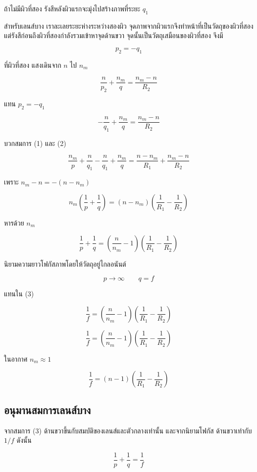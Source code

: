 ถ้าไม่มีผิวที่สอง รังสีหลังผิวแรกจะมุ่งไปสร้างภาพที่ระยะ $q_1$

สำหรับเลนส์บาง เราละเลยระยะห่างระหว่างสองผิว จุดภาพจากผิวแรกจึงทำหน้าที่เป็นวัตถุของผิวที่สอง แต่รังสีก่อนถึงผิวที่สองกำลังรวมเข้าหาจุดด้านขวา จุดนั้นเป็นวัตถุเสมือนของผิวที่สอง จึงมี

\[
p_2=-q_1
\]

ที่ผิวที่สอง แสงเดินจาก $n$ ไป $n_m$

\[
\frac{n}{p_2}
+
\frac{n_m}{q}
=
\frac{n_m-n}{R_2}
\]

แทน $p_2=-q_1$

\[
-\frac{n}{q_1}
+
\frac{n_m}{q}
=
\frac{n_m-n}{R_2}
\tag{2}
\]

บวกสมการ (1) และ (2)

\[
\frac{n_m}{p}
+
\frac{n}{q_1}
-
\frac{n}{q_1}
+
\frac{n_m}{q}
=
\frac{n-n_m}{R_1}
+
\frac{n_m-n}{R_2}
\]

เพราะ $n_m-n=-(n-n_m)$

\[
n_m\left(\frac{1}{p}+\frac{1}{q}\right)
=
(n-n_m)
\left(\frac{1}{R_1}-\frac{1}{R_2}\right)
\]

หารด้วย $n_m$

\[
\frac{1}{p}+\frac{1}{q}
=
\left(\frac{n}{n_m}-1\right)
\left(\frac{1}{R_1}-\frac{1}{R_2}\right)
\tag{3}
\]

นิยามความยาวโฟกัสภาพโดยให้วัตถุอยู่ไกลอนันต์

\[
p\to\infty
\qquad
q=f
\]

แทนใน (3)

\[
\frac{1}{f}
=
\left(\frac{n}{n_m}-1\right)
\left(\frac{1}{R_1}-\frac{1}{R_2}\right)
\]

\begin{tcolorbox}[title={สมการช่างทำเลนส์}]
\[
\boxed{
\frac{1}{f}
=
\left(\frac{n}{n_m}-1\right)
\left(\frac{1}{R_1}-\frac{1}{R_2}\right)}
\]

ในอากาศ $n_m\approx1$

\[
\boxed{
\frac{1}{f}
=
(n-1)
\left(\frac{1}{R_1}-\frac{1}{R_2}\right)}
\]
\end{tcolorbox}

\subsection{อนุมานสมการเลนส์บาง}

จากสมการ (3) ด้านขวาขึ้นกับสมบัติของเลนส์และตัวกลางเท่านั้น และจากนิยามโฟกัส ด้านขวาเท่ากับ $1/f$ ดังนั้น

\begin{tcolorbox}[title={สมการเลนส์บาง}]
\[
\boxed{\frac{1}{p}+\frac{1}{q}=\frac{1}{f}}
\]
\end{tcolorbox}

